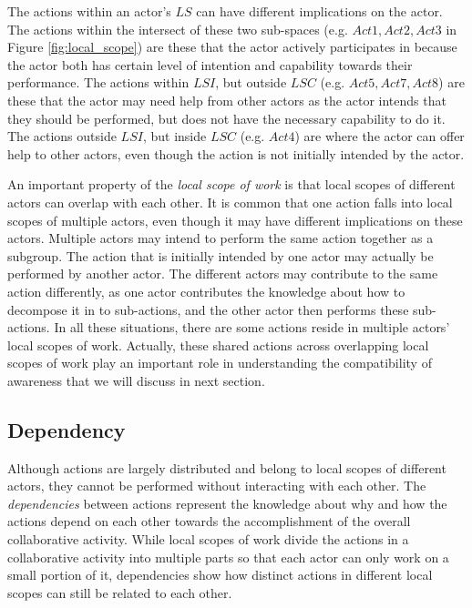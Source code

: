 The actions within an actor's $LS$ can have different implications on the actor. The actions within the intersect of these two sub-spaces (e.g. $Act1,Act2,Act3$ in Figure \ref{fig:local_scope}) are these that the actor actively participates in because the actor both has certain level of intention and capability towards their performance. The actions within $LSI$, but outside $LSC$ (e.g. $Act5,Act7,Act8$) are these that the actor may need help from other actors as the actor intends that they should be performed, but does not have the necessary capability to do it. The actions outside $LSI$, but inside $LSC$ (e.g. $Act4$) are where the actor can offer help to other actors, even though the action is not initially intended by the actor.

An important property of the \emph{local scope of work} is that local scopes of different actors can overlap with each other. It is common that one action falls into local scopes of multiple actors, even though it may have different implications on these actors. Multiple actors may intend to perform the same action together as a subgroup. The action that is initially intended by one actor may actually be performed by another actor. The different actors may contribute to the same action differently, as one actor contributes the knowledge about how to decompose it in to sub-actions, and the other actor then performs these sub-actions. In all these situations, there are some actions reside in multiple actors' local scopes of work. Actually, these shared actions across overlapping local scopes of work play an important role in understanding the compatibility of awareness that we will discuss in next section.

\subsection{Dependency} %
\label{sub:dependency}
Although actions are largely distributed and belong to local scopes of different actors, they cannot be performed without interacting with each other. The \emph{dependencies} between actions represent the knowledge about why and how the actions depend on each other towards the accomplishment of the overall collaborative activity. While local scopes of work divide the actions in a collaborative activity into multiple parts so that each actor can only work on a small portion of it, dependencies show how distinct actions in different local scopes can still be related to each other.

